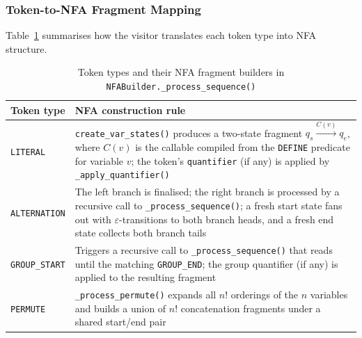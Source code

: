 \subsubsection{Token-to-NFA Fragment Mapping}
\label{subsubsec:meth-token-to-nfa}

Table~\ref{tab:token-nfa-map} summarises how the visitor translates
each token type into NFA structure.

\begin{table}[htbp]
  \centering
  \caption{Token types and their NFA fragment builders in
    \texttt{NFABuilder.\_process\_sequence()}}
  \label{tab:token-nfa-map}
  \begin{tabular}{lp{8.2cm}}
    \toprule
    \textbf{Token type}            & \textbf{NFA construction rule} \\
    \midrule
    \texttt{LITERAL}               & \texttt{create\_var\_states()} produces a
                                     two-state fragment
                                     $q_s \xrightarrow{C(v)} q_e$, where
                                     $C(v)$ is the callable compiled from the
                                     \texttt{DEFINE} predicate for variable $v$;
                                     the token's \texttt{quantifier} (if any) is
                                     applied by \texttt{\_apply\_quantifier()} \\[4pt]
    \texttt{ALTERNATION}           & The left branch is finalised; the right branch
                                     is processed by a recursive call to
                                     \texttt{\_process\_sequence()}; a fresh start
                                     state fans out with $\varepsilon$-transitions
                                     to both branch heads, and a fresh end state
                                     collects both branch tails \\[4pt]
    \texttt{GROUP\_START}          & Triggers a recursive call to
                                     \texttt{\_process\_sequence()} that reads
                                     until the matching \texttt{GROUP\_END}; the
                                     group quantifier (if any) is applied to the
                                     resulting fragment \\[4pt]
    \texttt{PERMUTE}               & \texttt{\_process\_permute()} expands all
                                     $n!$ orderings of the $n$ variables and
                                     builds a union of $n!$ concatenation
                                     fragments under a shared start/end pair \\[4pt]

\end{tabular}
\end{table}

